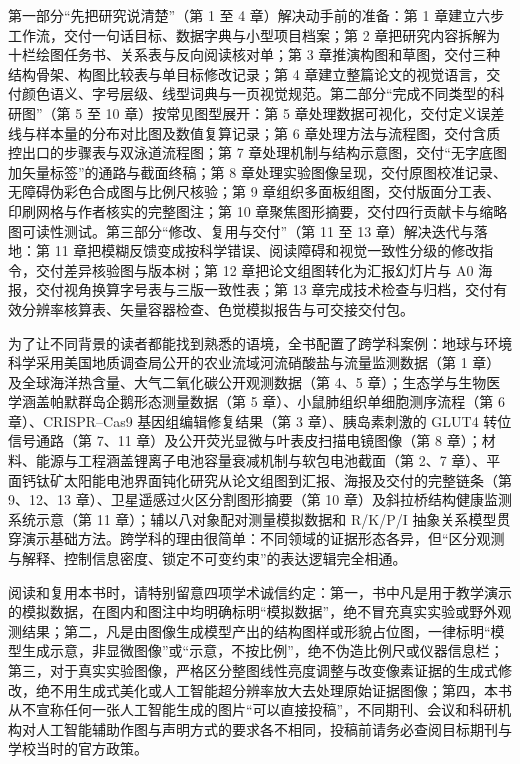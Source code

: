 第一部分“先把研究说清楚”（第 1 至 4 章）解决动手前的准备：第 1 章建立六步工作流，交付一句话目标、数据字典与小型项目档案；第 2 章把研究内容拆解为十栏绘图任务书、关系表与反向阅读核对单；第 3 章推演构图和草图，交付三种结构骨架、构图比较表与单目标修改记录；第 4 章建立整篇论文的视觉语言，交付颜色语义、字号层级、线型词典与一页视觉规范。第二部分“完成不同类型的科研图”（第 5 至 10 章）按常见图型展开：第 5 章处理数据可视化，交付定义误差线与样本量的分布对比图及数值复算记录；第 6 章处理方法与流程图，交付含质控出口的步骤表与双泳道流程图；第 7 章处理机制与结构示意图，交付“无字底图加矢量标签”的通路与截面终稿；第 8 章处理实验图像呈现，交付原图校准记录、无障碍伪彩色合成图与比例尺核验；第 9 章组织多面板组图，交付版面分工表、印刷网格与作者核实的完整图注；第 10 章聚焦图形摘要，交付四行贡献卡与缩略图可读性测试。第三部分“修改、复用与交付”（第 11 至 13 章）解决迭代与落地：第 11 章把模糊反馈变成按科学错误、阅读障碍和视觉一致性分级的修改指令，交付差异核验图与版本树；第 12 章把论文组图转化为汇报幻灯片与 A0 海报，交付视角换算字号表与三版一致性表；第 13 章完成技术检查与归档，交付有效分辨率核算表、矢量容器检查、色觉模拟报告与可交接交付包。

为了让不同背景的读者都能找到熟悉的语境，全书配置了跨学科案例：地球与环境科学采用美国地质调查局公开的农业流域河流硝酸盐与流量监测数据（第 1 章）及全球海洋热含量、大气二氧化碳公开观测数据（第 4、5 章）；生态学与生物医学涵盖帕默群岛企鹅形态测量数据（第 5 章）、小鼠肺组织单细胞测序流程（第 6 章）、CRISPR--Cas9 基因组编辑修复结果（第 3 章）、胰岛素刺激的 GLUT4 转位信号通路（第 7、11 章）及公开荧光显微与叶表皮扫描电镜图像（第 8 章）；材料、能源与工程涵盖锂离子电池容量衰减机制与软包电池截面（第 2、7 章）、平面钙钛矿太阳能电池界面钝化研究从论文组图到汇报、海报及交付的完整链条（第 9、12、13 章）、卫星遥感过火区分割图形摘要（第 10 章）及斜拉桥结构健康监测系统示意（第 11 章）；辅以八对象配对测量模拟数据和 R/K/P/I 抽象关系模型贯穿演示基础方法。跨学科的理由很简单：不同领域的证据形态各异，但“区分观测与解释、控制信息密度、锁定不可变约束”的表达逻辑完全相通。

阅读和复用本书时，请特别留意四项学术诚信约定：第一，书中凡是用于教学演示的模拟数据，在图内和图注中均明确标明“模拟数据”，绝不冒充真实实验或野外观测结果；第二，凡是由图像生成模型产出的结构图样或形貌占位图，一律标明“模型生成示意，非显微图像”或“示意，不按比例”，绝不伪造比例尺或仪器信息栏；第三，对于真实实验图像，严格区分整图线性亮度调整与改变像素证据的生成式修改，绝不用生成式美化或人工智能超分辨率放大去处理原始证据图像；第四，本书从不宣称任何一张人工智能生成的图片“可以直接投稿”，不同期刊、会议和科研机构对人工智能辅助作图与声明方式的要求各不相同，投稿前请务必查阅目标期刊与学校当时的官方政策。

